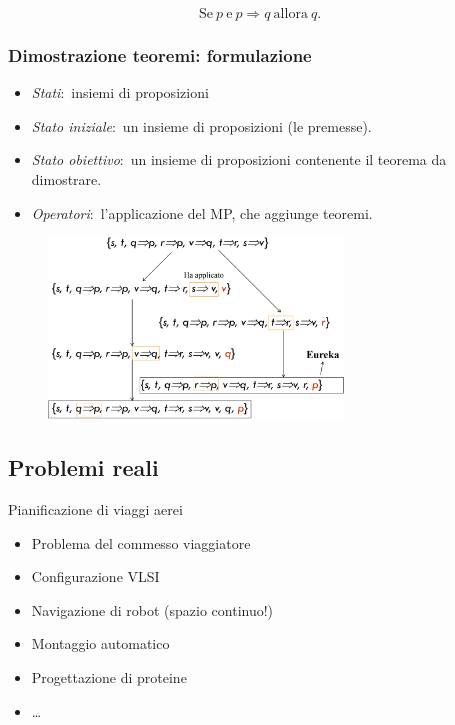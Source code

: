 \[\mathrm{Se}\ p\ \mathrm{e}\ p \Rightarrow q\ \mathrm{allora}\ q.\]


\subsubsection{Dimostrazione teoremi: formulazione}

\begin{itemize}
	\item \textit{Stati}:\ insiemi di proposizioni
	\item \textit{Stato iniziale}:\ un insieme di proposizioni (le premesse).
	\item \textit{Stato obiettivo}:\ un insieme di proposizioni contenente il teorema da dimostrare.
	\item \textit{Operatori}:\ l'applicazione del MP, che aggiunge teoremi.
\end{itemize}

\begin{figure}[H]
	\centering
	\includegraphics[width=0.7\textwidth]{immagini/Dim_teoremi.png}
\end{figure}

\subsection{Problemi reali}

Pianificazione di viaggi aerei
\begin{itemize}
	\item Problema del commesso viaggiatore
	\item Configurazione VLSI
	\item Navigazione di robot (spazio continuo!)
	\item Montaggio automatico
	\item Progettazione di proteine
	\item \dots
\end{itemize}

